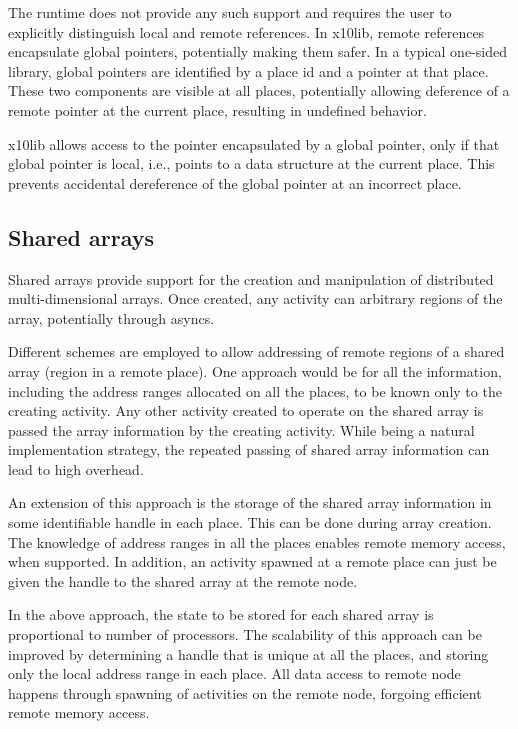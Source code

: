 \documentclass{article}
\begin{document}
The runtime does not provide any such support and requires the user to
explicitly distinguish local and remote references. In x10lib, remote
references encapsulate global pointers, potentially making them
safer. In a typical one-sided library, global pointers are identified
by a place id and a pointer at that place. These two components are
visible at all places, potentially allowing deference of a remote
pointer at the current place, resulting in undefined behavior.

x10lib allows access to the pointer encapsulated by a global pointer,
only if that global pointer is local, i.e., points to a data structure
at the current place. This prevents accidental dereference of the
global pointer at an incorrect place.

\subsection{Shared arrays}

Shared arrays provide support for the creation and manipulation of
distributed multi-dimensional arrays. Once created, any activity can
arbitrary regions of the array, potentially through asyncs. 

Different schemes are employed to allow addressing of remote regions
of a shared array (region in a remote place). One approach would be
for all the information, including the address ranges allocated on all
the places, to be known only to the creating activity. Any other
activity created to operate on the shared array is passed the array
information by the creating activity. While being a natural
implementation strategy, the repeated passing of shared array
information can lead to high overhead.

An extension of this approach is the storage of the shared array
information in some identifiable handle in each place. This can be
done during array creation. The knowledge of address ranges in all the
places enables remote memory access, when supported. In addition, an
activity spawned at a remote place can just be given the handle to the
shared array at the remote node. 

In the above approach, the state to be stored for each shared array is
proportional to number of processors. The scalability of this approach
can be improved by determining a handle that is unique at all the
places, and storing only the local address range in each place. All
data access to remote node happens through spawning of activities on
the remote node, forgoing efficient remote memory access. 
\end{document}
